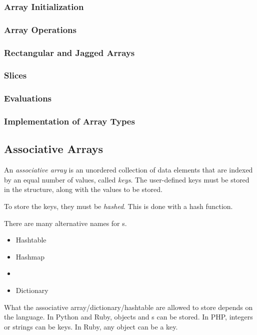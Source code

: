 \subsubsection{Array Initialization}\label{subsubsec:Arrays-Initialization}
\subsubsection{Array Operations}\label{subsubsec:Arrays-Operations}
\subsubsection{Rectangular and Jagged Arrays}\label{subsubsec:Arrays-Rectangular_Jagged}
\subsubsection{Slices}\label{subsubsec:Arrays-Slices}
\subsubsection{Evaluations}\label{subsubsec:Arrays-Evaluations}
\subsubsection{Implementation of Array Types}\label{subsubsec:Arrays-Implementation}

\subsection{Associative Arrays}\label{subsec:Associative_Arrays}
\begin{definition}\label{def:Associative_Array}
  An \emph{associative array} is an unordered collection of data elements that are indexed by an equal number of values, called \emph{keys}.
  The user-defined keys must be stored in the structure, along with the values to be stored.

  To store the keys, they must be \emph{hashed}.
  This is done with a hash function.

  \begin{remark}
    There are many alternative names for s.
    \begin{itemize}[noitemsep]
    \item Hashtable
    \item Hashmap
    \item {}
    \item Dictionary
    \end{itemize}
  \end{remark}

  \begin{remark}
    What the associative array/dictionary/hashtable are allowed to store depends on the language.
    In Python and Ruby, objects and s can be stored.
    In PHP, integers or strings can be keys.
    In Ruby, any object can be a key.
  \end{remark}
\end{definition}

